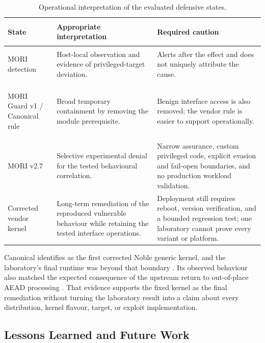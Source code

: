 \begin{table}[H]
    \centering
    \caption{Operational interpretation of the evaluated defensive states.}
    \label{tab:final-control-interpretation}
    \small
    \begin{tabularx}{\textwidth}{@{}>{\bfseries\raggedright\arraybackslash}p{}>{\raggedright\arraybackslash}p{}Y@{}}
        \toprule
        State & Appropriate interpretation & Required caution \\
        \midrule
        MORI detection &
        Host-local observation and evidence of privileged-target deviation. &
        Alerts after the effect and does not uniquely attribute the cause. \\

        MORI Guard v1 / Canonical rule &
        Broad temporary containment by removing the module prerequisite. &
        Benign interface access is also removed; the vendor rule is easier to
        support operationally. \\

        MORI v2.7 &
        Selective experimental denial for the tested behavioural correlation. &
        Narrow assurance, custom privileged code, explicit evasion and
        fail-open boundaries, and no production workload validation. \\

        Corrected vendor kernel &
        Long-term remediation of the reproduced vulnerable behaviour while
        retaining the tested interface operations. &
        Deployment still requires reboot, version verification, and a bounded
        regression test; one laboratory cannot prove every variant or platform. \\
        \bottomrule
    \end{tabularx}
\end{table}

Canonical identifies  as the first corrected Noble generic
kernel, and the laboratory's final  runtime was beyond that
boundary \cite{ubuntu-copyfail-cve}. Its observed behaviour also matched the
expected consequence of the upstream return to out-of-place AEAD processing
\cite{linux-copyfail-fix}. That evidence supports the fixed kernel as the final
remediation without turning the laboratory result into a claim about every
distribution, kernel flavour, target, or exploit implementation.

\subsection{Lessons Learned and Future Work}

